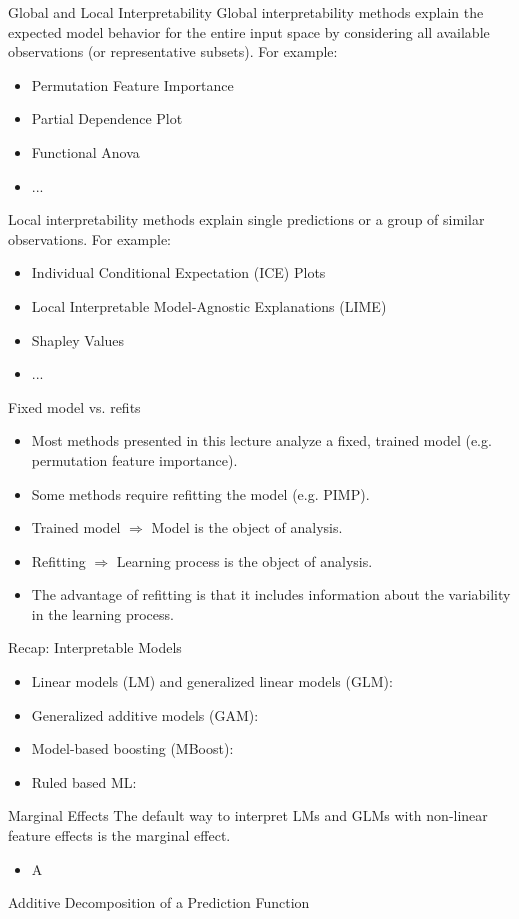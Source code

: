 \documentclass[11pt,compress,t,notes=noshow, xcolor=table]{beamer}
\begin{document}
\begin{vbframe}{Global and Local Interpretability}
Global interpretability methods explain the expected model behavior for the entire input space by considering all available observations (or representative subsets). For example:
  \begin{itemize}
    \item Permutation Feature Importance
    \item Partial Dependence Plot
    \item Functional Anova
    \item ...
  \end{itemize}
\lz
Local interpretability methods explain single predictions or a group of similar observations. For example:
 \begin{itemize}
  \item Individual Conditional Expectation (ICE) Plots
  \item Local Interpretable Model-Agnostic Explanations (LIME)
  \item Shapley Values
  \item ...
 \end{itemize}
\end{vbframe}


\begin{vbframe}{Fixed model vs. refits}
  \begin{itemize}
     \itemsep2em
     \item Most methods presented in this lecture analyze a fixed, trained model 
     (e.g. permutation feature importance).
     \item Some methods require refitting the model (e.g. PIMP).
     \item Trained model $\Rightarrow$ Model is the object of analysis.
     \item Refitting $\Rightarrow$ Learning process is the object of analysis.
     \item The advantage of refitting is that it includes information about the variability in the learning process.
  \end{itemize}
\end{vbframe}



\begin{vbframe}{Recap: Interpretable Models}

\begin{itemize}
\item Linear models (LM) and generalized linear models (GLM):
\item Generalized additive models (GAM):
\item Model-based boosting (MBoost):
\item Ruled based ML:
\end{itemize}
\end{vbframe}

\begin{vbframe}{Marginal Effects}
The default way to interpret LMs and GLMs with non-linear feature effects is the marginal effect.
\begin{itemize}
\item A
\end{itemize}

\end{vbframe}


\begin{vbframe}{Additive Decomposition of a Prediction Function}


\end{vbframe}


\endlecture
\end{document}
